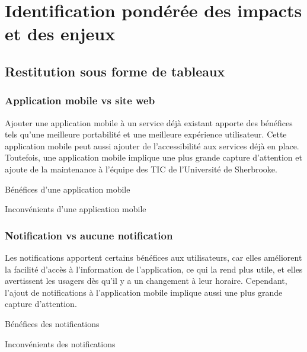 \renewcommand{\arraystretch}{2}

\section{Identification pondérée des impacts et des enjeux}
	\subsection{Restitution sous forme de tableaux}
		\subsubsection{Application mobile vs site web}
		Ajouter une application mobile à un service déjà existant apporte des bénéfices tels qu'une meilleure portabilité et une meilleure expérience utilisateur. Cette application mobile peut aussi ajouter de l'accessibilité aux services déjà en place. Toutefois, une application mobile implique une plus grande capture d'attention et ajoute de la maintenance à l'équipe des TIC de l'Université de Sherbrooke. 
	
		\begin{sidewaystable}[p]
			\centering
			\caption{Bénéfices d'une application mobile}
			\label{tab.app+}
			
		\bigskip\bigskip
			\centering
			\caption{Inconvénients d'une application mobile}
			\label{tab.app-}
			
		\end{sidewaystable}
		
		\subsubsection{Notification vs aucune notification}
		Les notifications apportent certains bénéfices aux utilisateurs, car elles améliorent la facilité d'accès à l'information de l'application, ce qui la rend plus utile, et elles avertissent les usagers dès qu'il y a un changement à leur horaire. Cependant, l'ajout de notifications à l'application mobile implique aussi une plus grande capture d'attention.
	
		\begin{sidewaystable}[p]
			\centering
			\caption{Bénéfices des notifications}
			\label{tab.notif+}
			
		\bigskip\bigskip
			\centering
			\caption{Inconvénients des notifications}
			\label{tab.notif-}
			
		\end{sidewaystable}
		
